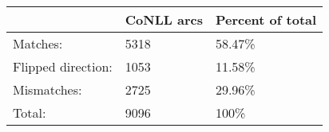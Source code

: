 	\begin{tabular}{|l|l|l|}
		\hline
		 & CoNLL arcs & Percent of total \\ 
		\hline
		Matches: & 5318 & 58.47\%\\ 
		\hline
		Flipped direction: & 1053 & 11.58\%\\ 
		\hline
		Mismatches: & 2725 & 29.96\%\\ 
		\hline
		Total: & 9096 & 100\% \\ 
		\hline
	\end{tabular}
